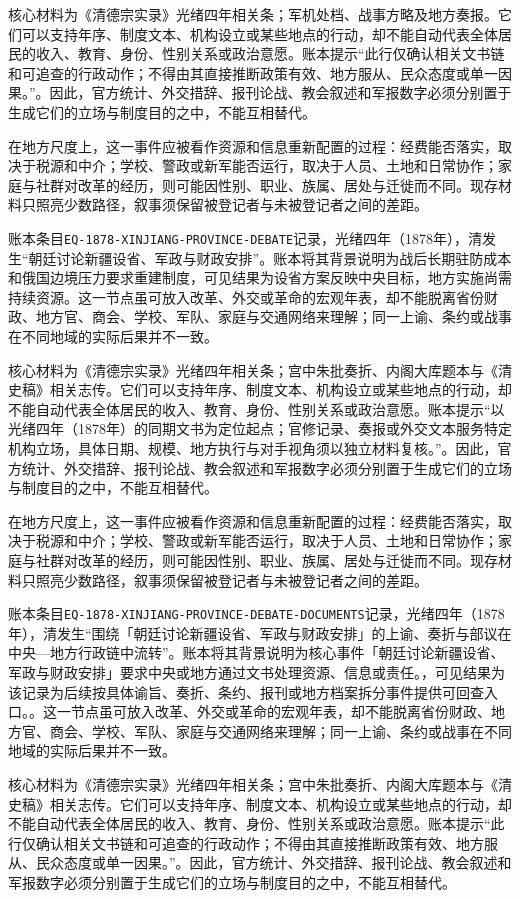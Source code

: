 核心材料为《清德宗实录》光绪四年相关条；军机处档、战事方略及地方奏报。它们可以支持年序、制度文本、机构设立或某些地点的行动，却不能自动代表全体居民的收入、教育、身份、性别关系或政治意愿。账本提示“此行仅确认相关文书链和可追查的行政动作；不得由其直接推断政策有效、地方服从、民众态度或单一因果。”。因此，官方统计、外交措辞、报刊论战、教会叙述和军报数字必须分别置于生成它们的立场与制度目的之中，不能互相替代。

在地方尺度上，这一事件应被看作资源和信息重新配置的过程：经费能否落实，取决于税源和中介；学校、警政或新军能否运行，取决于人员、土地和日常协作；家庭与社群对改革的经历，则可能因性别、职业、族属、居处与迁徙而不同。现存材料只照亮少数路径，叙事须保留被登记者与未被登记者之间的差距。

账本条目\texttt{EQ-1878-XINJIANG-PROVINCE-DEBATE}记录，光绪四年（1878年），清发生“朝廷讨论新疆设省、军政与财政安排”。账本将其背景说明为战后长期驻防成本和俄国边境压力要求重建制度，可见结果为设省方案反映中央目标，地方实施尚需持续资源。这一节点虽可放入改革、外交或革命的宏观年表，却不能脱离省份财政、地方官、商会、学校、军队、家庭与交通网络来理解；同一上谕、条约或战事在不同地域的实际后果并不一致。

核心材料为《清德宗实录》光绪四年相关条；宫中朱批奏折、内阁大库题本与《清史稿》相关志传。它们可以支持年序、制度文本、机构设立或某些地点的行动，却不能自动代表全体居民的收入、教育、身份、性别关系或政治意愿。账本提示“以光绪四年（1878年）的同期文书为定位起点；官修记录、奏报或外交文本服务特定机构立场，具体日期、规模、地方执行与对手视角须以独立材料复核。”。因此，官方统计、外交措辞、报刊论战、教会叙述和军报数字必须分别置于生成它们的立场与制度目的之中，不能互相替代。

在地方尺度上，这一事件应被看作资源和信息重新配置的过程：经费能否落实，取决于税源和中介；学校、警政或新军能否运行，取决于人员、土地和日常协作；家庭与社群对改革的经历，则可能因性别、职业、族属、居处与迁徙而不同。现存材料只照亮少数路径，叙事须保留被登记者与未被登记者之间的差距。

账本条目\texttt{EQ-1878-XINJIANG-PROVINCE-DEBATE-DOCUMENTS}记录，光绪四年（1878年），清发生“围绕「朝廷讨论新疆设省、军政与财政安排」的上谕、奏折与部议在中央—地方行政链中流转”。账本将其背景说明为核心事件「朝廷讨论新疆设省、军政与财政安排」要求中央或地方通过文书处理资源、信息或责任。，可见结果为该记录为后续按具体谕旨、奏折、条约、报刊或地方档案拆分事件提供可回查入口。。这一节点虽可放入改革、外交或革命的宏观年表，却不能脱离省份财政、地方官、商会、学校、军队、家庭与交通网络来理解；同一上谕、条约或战事在不同地域的实际后果并不一致。

核心材料为《清德宗实录》光绪四年相关条；宫中朱批奏折、内阁大库题本与《清史稿》相关志传。它们可以支持年序、制度文本、机构设立或某些地点的行动，却不能自动代表全体居民的收入、教育、身份、性别关系或政治意愿。账本提示“此行仅确认相关文书链和可追查的行政动作；不得由其直接推断政策有效、地方服从、民众态度或单一因果。”。因此，官方统计、外交措辞、报刊论战、教会叙述和军报数字必须分别置于生成它们的立场与制度目的之中，不能互相替代。

